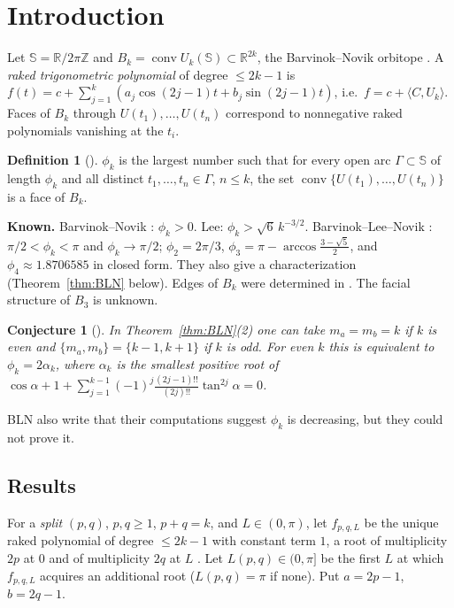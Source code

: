 \documentclass[11pt]{amsart}
\newtheorem{conjecture}[theorem]{Conjecture}
\theoremstyle{definition}
\newtheorem{definition}[theorem]{Definition}
\newcommand{\R}{\mathbb{R}}
\newcommand{\Sph}{\mathbb{S}}
\begin{document}
\section{Introduction}

Let $\Sph=\R/2\pi\mathbb Z$ and $B_k=\operatorname{conv}U_k(\Sph)\subset\R^{2k}$, the Barvinok--Novik orbitope \cite{BN08,SSS}.
A \emph{raked trigonometric polynomial} of degree $\le2k-1$ is $f(t)=c+\sum_{j=1}^k(a_j\cos(2j-1)t+b_j\sin(2j-1)t)$, i.e.\
$f=c+\langle C,U_k\rangle$. Faces of $B_k$ through $U(t_1),\dots,U(t_n)$ correspond to nonnegative raked polynomials vanishing at the $t_i$.

\begin{definition}[\cite{BLN}]
$\phi_k$ is the largest number such that for every open arc $\Gamma\subset\Sph$ of length $\phi_k$ and all distinct
$t_1,\dots,t_n\in\Gamma$, $n\le k$, the set $\operatorname{conv}\{U(t_1),\dots,U(t_n)\}$ is a face of $B_k$.
\end{definition}

\noindent\textbf{Known.} Barvinok--Novik \cite{BN08}: $\phi_k>0$. Lee: $\phi_k>\sqrt6\,k^{-3/2}$.
Barvinok--Lee--Novik \cite{BLN}: $\pi/2<\phi_k<\pi$ and $\phi_k\to\pi/2$; $\phi_2=2\pi/3$, $\phi_3=\pi-\arccos\frac{3-\sqrt5}2$,
and $\phi_4\approx1.8706585$ in closed form. They also give a characterization (Theorem~\ref{thm:BLN} below).
Edges of $B_k$ were determined in \cite{BN08,Vin}. The facial structure of $B_3$ is unknown.

\begin{conjecture}[\cite{BLN}]\label{conj:BLN}
In Theorem~\ref{thm:BLN}(2) one can take $m_a=m_b=k$ if $k$ is even and $\{m_a,m_b\}=\{k-1,k+1\}$ if $k$ is odd.
For even $k$ this is equivalent to $\phi_k=2\alpha_k$, where $\alpha_k$ is the smallest positive root of
$\cos\alpha+1+\sum_{j=1}^{k-1}(-1)^j\frac{(2j-1)!!}{(2j)!!}\tan^{2j}\alpha=0$.
\end{conjecture}

BLN also write that their computations suggest $\phi_k$ is decreasing, but they could not prove it.

\subsection*{Results}
For a \emph{split} $(p,q)$, $p,q\ge1$, $p+q=k$, and $L\in(0,\pi)$, let $f_{p,q,L}$ be the unique raked polynomial of degree $\le2k-1$
with constant term $1$, a root of multiplicity $2p$ at $0$ and of multiplicity $2q$ at $L$ \cite[Cor.~3.5]{BLN}. Let $L(p,q)\in(0,\pi]$
be the first $L$ at which $f_{p,q,L}$ acquires an additional root ($L(p,q)=\pi$ if none). Put $a=2p-1$, $b=2q-1$.
\end{document}
